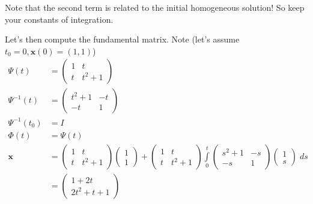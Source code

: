 \documentclass[10pt]{report}
\begin{document}
Note that the second term is related to the initial homogeneous solution! So keep your constants of integration.

Let's then compute the fundamental matrix. Note (let's assume $t_0 = 0, \mathbf{x}(0) = (1,1)$)
\begin{align}
    \Psi(t) &= \begin{pmatrix} 1 & t \\ t & t^2 + 1 \end{pmatrix} \\
    \Psi^{-1}(t) &= \begin{pmatrix} t^2 + 1 & -t \\ -t & 1 \end{pmatrix} \\
    \Psi^{-1}(t_0) &= I\\
    \Phi(t) &= \Psi(t)\\
    \mathbf{x} &= \begin{pmatrix} 1 & t \\ t & t^2 + 1 \end{pmatrix} \begin{pmatrix} 1\\1 \end{pmatrix}  + \begin{pmatrix} 1 & t \\ t & t^2+1 \end{pmatrix} \displaystyle\int\limits_{0}^{t}\begin{pmatrix} s^2 + 1 & -s\\-s & 1 \end{pmatrix} \begin{pmatrix} 1 \\s\end{pmatrix} \;ds\\
    &= \begin{pmatrix} 1 + 2t\\2t^2 + t + 1 \end{pmatrix} 
\end{align}
\end{document}
